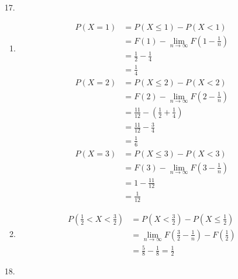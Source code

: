 \documentclass{article}
\begin{document}
\begin{itemize}
\item [17.]
  \begin{enumerate}[label=(\alph*)]
  \item
    \begin{equation*}
      \begin{split}
        P(X=1)
        &= P(X \leq 1) - P(X < 1) \\
        &= F(1) - \lim_{n \rightarrow \infty}F(1 - \frac{1}{n})\\
        &= \frac{1}{2} - \frac{1}{4}\\
        &= \frac{1}{4}
      \end{split}
    \end{equation*}
    \begin{equation*}
      \begin{split}
        P(X=2)
        &= P(X \leq 2) - P(X < 2)\\
        &= F(2) - \lim_{n \rightarrow \infty} F(2- \frac{1}{n})\\
        &= \frac{11}{12} - (\frac{1}{2}+\frac{1}{4})\\
        &= \frac{11}{12} - \frac{3}{4}\\
        &= \frac{1}{6}
      \end{split}
    \end{equation*}
    \begin{equation*}
      \begin{split}
      P(X = 3)
      &= P(X \leq 3) - P(X < 3)\\
      &= F(3) - \lim_{n \rightarrow \infty} F(3 - \frac{1}{n})\\
      &= 1 - \frac{11}{12}\\
      &= \frac{1}{12}
    \end{split}
    \end{equation*}
  \item
    \begin{equation*}
      \begin{split}
        P(\frac{1}{2} < X < \frac{3}{2})
        &= P(X < \frac{3}{2}) - P(X \leq \frac{1}{2}) \\
        &= \lim_{n \rightarrow \infty}F(\frac{3}{2}-\frac{1}{n}) - F(\frac{1}{2})\\
        &= \frac{5}{8} - \frac{1}{8} = \frac{1}{2}
      \end{split}
    \end{equation*}
  \end{enumerate}
\item [18.]
  \begin{figure}[H]

\end{figure}
\end{itemize}
\end{document}
